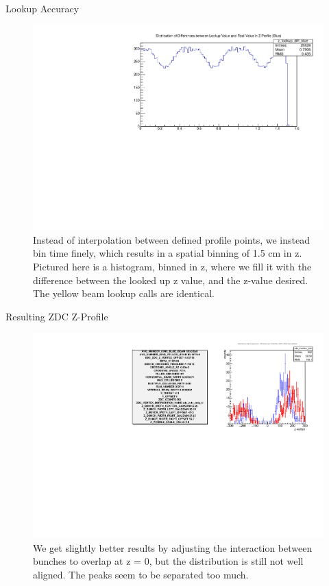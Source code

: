 \begin{frame}{Lookup Accuracy}
\begin{figure}
\begin{center}
\includegraphics[width=0.8\linewidth]{../ExploringZProfile/figs/359711_lookup_z.pdf}
\end{center}
\caption{Instead of interpolation between defined profile points, we instead bin
time finely, which results in a spatial binning of 1.5 cm in z. Pictured here
is a histogram, binned in z, where we fill it with the difference between the
looked up z value, and the z-value desired. The yellow beam lookup calls are
identical.}
\label{fig:359711_lookup_z}
\end{figure}
\end{frame}

\begin{frame}{Resulting ZDC Z-Profile}
\begin{figure}
\begin{center}
\includegraphics[width=0.8\linewidth]{../ExploringZProfile/figs/359711_step_0_zvertex_compare.pdf}
\end{center}
\caption{We get slightly better results by adjusting the interaction between
bunches to overlap at z = 0, but the distribution is still not well aligned. The
peaks seem to be separated too much.}
\label{fig:359711_step_0_zvertex_compare}
\end{figure}
\end{frame}

